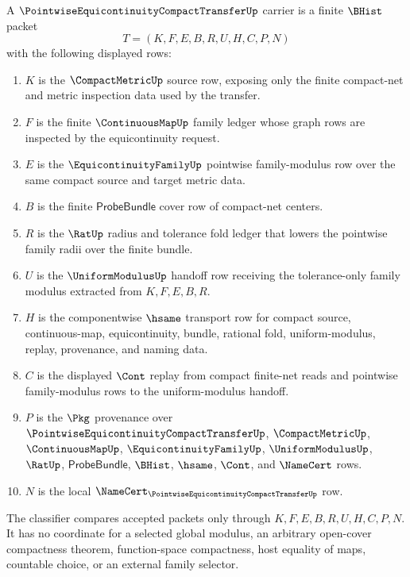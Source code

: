 \begin{definition}
\label{def:pointwise-equicontinuity-compact-transfer-carrier}
A $\PointwiseEquicontinuityCompactTransferUp$ carrier is a finite $\BHist$ packet
$$
T=(K,F,E,B,R,U,H,C,P,N)
$$
with the following displayed rows:
\begin{enumerate}
\item $K$ is the $\CompactMetricUp$ source row, exposing only the finite compact-net and metric inspection data used by the transfer.
\item $F$ is the finite $\ContinuousMapUp$ family ledger whose graph rows are inspected by the equicontinuity request.
\item $E$ is the $\EquicontinuityFamilyUp$ pointwise family-modulus row over the same compact source and target metric data.
\item $B$ is the finite $\mathsf{ProbeBundle}$ cover row of compact-net centers.
\item $R$ is the $\RatUp$ radius and tolerance fold ledger that lowers the pointwise family radii over the finite bundle.
\item $U$ is the $\UniformModulusUp$ handoff row receiving the tolerance-only family modulus extracted from $K,F,E,B,R$.
\item $H$ is the componentwise $\hsame$ transport row for compact source, continuous-map, equicontinuity, bundle, rational fold, uniform-modulus, replay, provenance, and naming data.
\item $C$ is the displayed $\Cont$ replay from compact finite-net reads and pointwise family-modulus rows to the uniform-modulus handoff.
\item $P$ is the $\Pkg$ provenance over $\PointwiseEquicontinuityCompactTransferUp$, $\CompactMetricUp$, $\ContinuousMapUp$, $\EquicontinuityFamilyUp$, $\UniformModulusUp$, $\RatUp$, $\mathsf{ProbeBundle}$, $\BHist$, $\hsame$, $\Cont$, and $\NameCert$ rows.
\item $N$ is the local $\NameCert_{\PointwiseEquicontinuityCompactTransferUp}$ row.
\end{enumerate}
The classifier compares accepted packets only through $K,F,E,B,R,U,H,C,P,N$. It has no coordinate for a selected global modulus, an arbitrary open-cover compactness theorem, function-space compactness, host equality of maps, countable choice, or an external family selector.
\end{definition}


